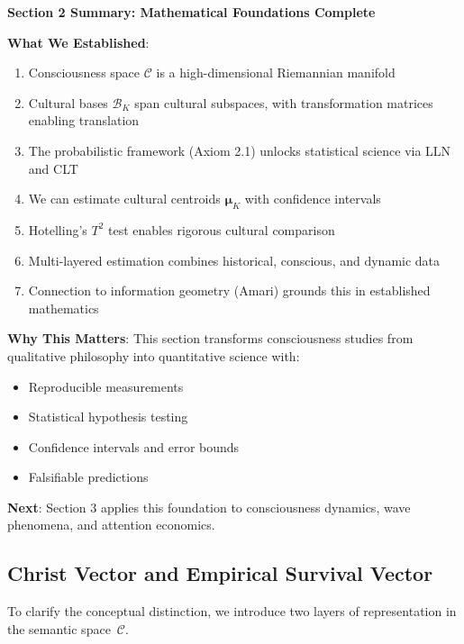 \documentclass[11pt,a4paper]{article}
\theoremstyle{definition}
\theoremstyle{remark}
\newcommand{\CC}{\mathcal{C}}
\begin{document}
\begin{mdframed}[backgroundcolor=green!10,linewidth=2pt,linecolor=green!70!black]
\textbf{Section 2 Summary: Mathematical Foundations Complete}

\textbf{What We Established}:
\begin{enumerate}[nosep]
    \item Consciousness space \(\CC\) is a high-dimensional Riemannian manifold
    \item Cultural bases \(\mathcal{B}_K\) span cultural subspaces, with transformation matrices enabling translation
    \item The probabilistic framework (Axiom 2.1) unlocks statistical science via LLN and CLT
    \item We can estimate cultural centroids \(\boldsymbol{\mu}_K\) with confidence intervals
    \item Hotelling's \(T^2\) test enables rigorous cultural comparison
    \item Multi-layered estimation combines historical, conscious, and dynamic data
    \item Connection to information geometry (Amari) grounds this in established mathematics
\end{enumerate}

\textbf{Why This Matters}:
This section transforms consciousness studies from qualitative philosophy into quantitative science with:
\begin{itemize}[nosep]
    \item Reproducible measurements
    \item Statistical hypothesis testing  
    \item Confidence intervals and error bounds
    \item Falsifiable predictions
\end{itemize}

\textbf{Next}: Section 3 applies this foundation to consciousness dynamics, wave phenomena, and attention economics.
\end{mdframed}


\subsection{Christ Vector and Empirical Survival Vector}

To clarify the conceptual distinction, we introduce two layers of representation in the semantic space~$\mathcal{C}$.
\end{document}
